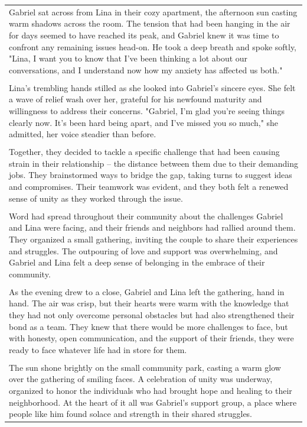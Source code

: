 \begin{small}
\begin{longtable}{p{}}
\\
Gabriel sat across from Lina in their cozy apartment, the afternoon sun casting warm shadows across the room. The tension that had been hanging in the air for days seemed to have reached its peak, and Gabriel knew it was time to confront any remaining issues head-on. He took a deep breath and spoke softly, "Lina, I want you to know that I've been thinking a lot about our conversations, and I understand now how my anxiety has affected us both."
\\
\\
Lina's trembling hands stilled as she looked into Gabriel's sincere eyes. She felt a wave of relief wash over her, grateful for his newfound maturity and willingness to address their concerns. "Gabriel, I'm glad you're seeing things clearly now. It's been hard being apart, and I've missed you so much," she admitted, her voice steadier than before.
\\
\\
Together, they decided to tackle a specific challenge that had been causing strain in their relationship – the distance between them due to their demanding jobs. They brainstormed ways to bridge the gap, taking turns to suggest ideas and compromises. Their teamwork was evident, and they both felt a renewed sense of unity as they worked through the issue.
\\
\\
Word had spread throughout their community about the challenges Gabriel and Lina were facing, and their friends and neighbors had rallied around them. They organized a small gathering, inviting the couple to share their experiences and struggles. The outpouring of love and support was overwhelming, and Gabriel and Lina felt a deep sense of belonging in the embrace of their community.
\\
\\
As the evening drew to a close, Gabriel and Lina left the gathering, hand in hand. The air was crisp, but their hearts were warm with the knowledge that they had not only overcome personal obstacles but had also strengthened their bond as a team. They knew that there would be more challenges to face, but with honesty, open communication, and the support of their friends, they were ready to face whatever life had in store for them.
\\
\\
The sun shone brightly on the small community park, casting a warm glow over the gathering of smiling faces. A celebration of unity was underway, organized to honor the individuals who had brought hope and healing to their neighborhood. At the heart of it all was Gabriel's support group, a place where people like him found solace and strength in their shared struggles.

\end{longtable}
\end{small}
